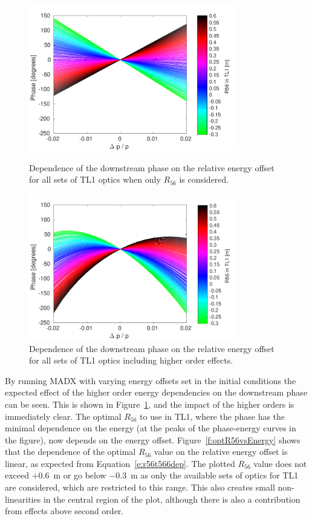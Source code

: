 \begin{figure}
  \centering
  \includegraphics[width=0.8\textwidth]{Figures/propagation/phaseVsEn_r56Only}
  \caption{Dependence of the downstream phase on the relative energy offset for all sets of TL1 optics when only \(R_{56}\) is considered.}
  \label{f:phaseVsEn_r56Only}  
  \centering
  \includegraphics[width=0.8\textwidth]{Figures/propagation/phaseVsEn_t566}
  \caption{Dependence of the downstream phase on the relative energy offset for all sets of TL1 optics including higher order effects.}
  \label{f:phaseVsEn_t566}
\end{figure}

By running MADX with varying energy offsets set in the initial conditions the expected effect of the higher order energy dependencies on the downstream phase can be seen. This is shown in Figure~\ref{f:phaseVsEn_t566}, and the impact of the higher orders is immediately clear. The optimal \(R_{56}\) to use in TL1, where the phase has the minimal dependence on the energy (at the peaks of the phase-energy curves in the figure), now depends on the energy offset. Figure~\ref{f:optR56vsEnergy} shows that the dependence of the optimal \(R_{56}\) value on the relative energy offset is linear, as expected from Equation~\ref{e:r56t566dep}. The plotted \(R_{56}\) value does not exceed \(+0.6\)~m or go below \(-0.3\)~m as only the available sets of optics for TL1 are considered, which are restricted to this range. This also creates small non-linearities in the central region of the plot, although there is also a contribution from effects above second order. 


